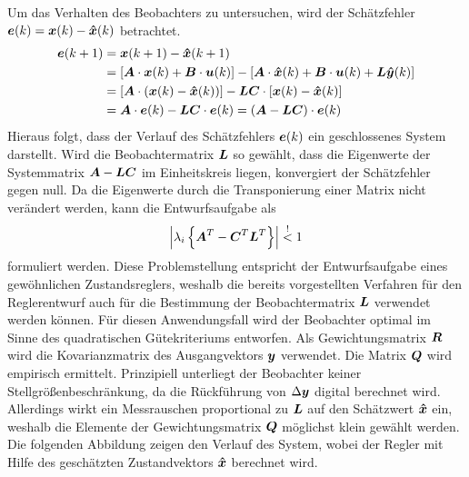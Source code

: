 Um das Verhalten des Beobachters zu untersuchen, wird der Schätzfehler $\boldsymbol{e}(k) = \boldsymbol{x}(k) - \boldsymbol{\hat{x}}(k)$ betrachtet.
\begin{equation}
\begin{split}
\boldsymbol{e}(k+1) &= \boldsymbol{x}(k+1) - \boldsymbol{\hat{x}}(k+1) \\
&= [\boldsymbol{A}\cdot \boldsymbol{x}(k) + \boldsymbol{B}\cdot \boldsymbol{u}(k)] - [\boldsymbol{A}\cdot \boldsymbol{\hat{x}}(k) + \boldsymbol{B}\cdot \boldsymbol{u}(k) +\boldsymbol{L}\boldsymbol{\hat{y}}(k)]
\\
&= [\boldsymbol{A}\cdot (\boldsymbol{x}(k) - \boldsymbol{\hat{x}}(k))] - \boldsymbol{L}\boldsymbol{C}\cdot[\boldsymbol{x}(k)-\boldsymbol{\hat{x}}(k)] 
\\
&= \boldsymbol{A}\cdot \boldsymbol{e}(k) - \boldsymbol{LC}\cdot\boldsymbol{e}(k) = (\boldsymbol{A}-\boldsymbol{LC})\cdot \boldsymbol{e}(k)
\end{split}
\end{equation}
Hieraus folgt, dass der Verlauf des Schätzfehlers $\boldsymbol{e}(k)$ ein geschlossenes System darstellt. Wird die Beobachtermatrix $\boldsymbol{L}$ so gewählt, dass die Eigenwerte der Systemmatrix $\boldsymbol{A}-\boldsymbol{LC}$ im Einheitskreis liegen, konvergiert der Schätzfehler gegen null. Da die Eigenwerte durch die Transponierung einer Matrix nicht verändert werden, kann die Entwurfsaufgabe als
\begin{equation}
\left\vert \lambda_i\left\{\boldsymbol{A}^T-\boldsymbol{C}^T\boldsymbol{L}^T\right\}\right\vert \overset{!}< 1
\end{equation}
formuliert werden. Diese Problemstellung entspricht der Entwurfsaufgabe eines gewöhnlichen Zustandsreglers, weshalb die bereits vorgestellten Verfahren für den Reglerentwurf auch für die Bestimmung der Beobachtermatrix $\boldsymbol{L}$ verwendet werden können. Für diesen Anwendungsfall wird der Beobachter optimal im Sinne des quadratischen Gütekriteriums entworfen. Als Gewichtungsmatrix $\boldsymbol{R}$ wird die Kovarianzmatrix des Ausgangvektors $\boldsymbol{y}$ verwendet. Die Matrix $\boldsymbol{Q}$ wird empirisch ermittelt. Prinzipiell unterliegt der Beobachter keiner Stellgrößenbeschränkung, da die Rückführung von $\Delta\boldsymbol{y}$ digital berechnet wird. Allerdings wirkt ein Messrauschen proportional zu $\boldsymbol{L}$ auf den Schätzwert $\boldsymbol{\hat{x}}$ ein, weshalb die Elemente der Gewichtungsmatrix $\boldsymbol{Q}$ möglichst klein gewählt werden. Die folgenden Abbildung zeigen den Verlauf des System, wobei der Regler mit Hilfe des geschätzten Zustandvektors $\boldsymbol{\hat{x}}$ berechnet wird.
